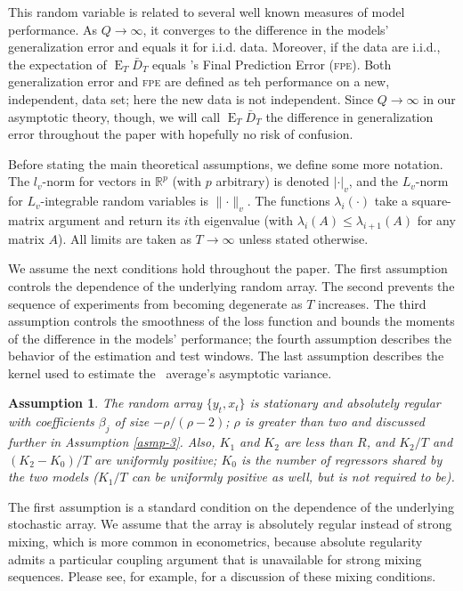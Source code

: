 \documentclass[11pt]{article}
\newtheorem{asmp}{Assumption}
\DeclareMathOperator{\E}{E}
\newcommand{\citepos}[1]{\citeauthor{#1}'s \citeyearpar{#1}}
\newcommand{\oosB}{\bar{D}_{T}}
\renewcommand{\Re}{\ensuremath{\mathbb{R}}}
\begin{document}
This random variable is related to several well known measures of
model performance.  As $Q \to \infty$, it converges to the difference
in the models' generalization error and equals it for i.i.d. data.
Moreover, if the data are i.i.d., the expectation of $\E_T \oosB$
equals \citepos{Aka:69} Final Prediction Error (\textsc{fpe}).  Both
generalization error and \textsc{fpe} are defined as teh performance
on a new, independent, data set; here the new data is not
independent.  Since $Q \to \infty$ in our asymptotic theory, though,
we will call $\E_T \oosB$ the difference in generalization error
throughout the paper with hopefully no risk of confusion.

Before stating the main theoretical assumptions, we define some more
notation.  The $l_v$-norm for vectors in $\Re^p$ (with $p$ arbitrary)
is denoted $\lvert \cdot \rvert_v$, and the $L_v$-norm for
$L_v$-integrable random variables is $\lVert \cdot \rVert_v$.  The
functions $\lambda_i(\cdot)$ take a square-matrix argument and return
its $i$th eigenvalue (with $\lambda_{i}(A) \leq \lambda_{i+1}(A)$ for
any matrix $A$).
All limits are taken as $T \to \infty$ unless stated otherwise.
 
We assume the next conditions hold throughout the paper.  The first
assumption controls the dependence of the underlying random array.
The second prevents the sequence of experiments from becoming
degenerate as $T$ increases.  The third assumption controls the
smoothness of the loss function and bounds the moments of the
difference in the models' performance; the fourth assumption describes
the behavior of the estimation and test windows.  The last assumption
describes the kernel used to estimate the \oos\ average's asymptotic
variance.

\begin{asmp}\label{asmp-1} 
  The random array $\{y_t,x_t\}$ is stationary and absolutely regular
  with coefficients $\beta_j$ of size $-\rho/(\rho-2)$; $\rho$ is
  greater than two and discussed further in Assumption \ref{asmp-3}.
  Also, $K_1$ and $K_2$ are less than $R$, and $K_2/T$ and
  $(K_2-K_0)/T$ are uniformly positive; $K_0$ is the number of
  regressors shared by the two models ($K_1/T$ can be uniformly
  positive as well, but is not required to be).
\end{asmp}

The first assumption is a standard condition on the dependence of the
underlying stochastic array.  We assume that the array is absolutely
regular instead of strong mixing, which is more common in
econometrics, because absolute regularity admits a particular coupling
argument \citep{Ber:79} that is unavailable for strong mixing
sequences.  Please see, for example, \citet{Dav:94} for a discussion
of these mixing conditions.
\end{document}

